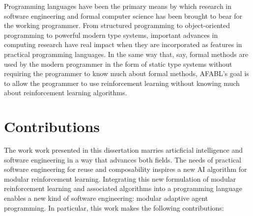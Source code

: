 Programming languages have been the primary means by which research in software engineering and formal computer science has been brought to bear for the working programmer. From structured programming to object-oriented programming to powerful modern type systems, important advances in computing research have real impact when they are incorporated as features in practical programming languages. In the same way that, say, formal methods are used by the modern programmer in the form of static type systems without requiring the programmer to know much about formal methods, AFABL's goal is to allow the programmer to use reinforcement learning without knowing much about reinforcement learning algorithms.

\section{Contributions}

The work work presented in this dissertation marries articficial intelligence and software engineering in a way that advances both fields. The needs of practical software engineering for reuse and composability inspires a new AI algorithm for modular reinforcement learning. Integrating this new formulation of modular reinforcement learning and associated algorithms into a programming language enables a new kind of software engineering: modular adaptive agent programming. In particular, this work makes the following contributions:

